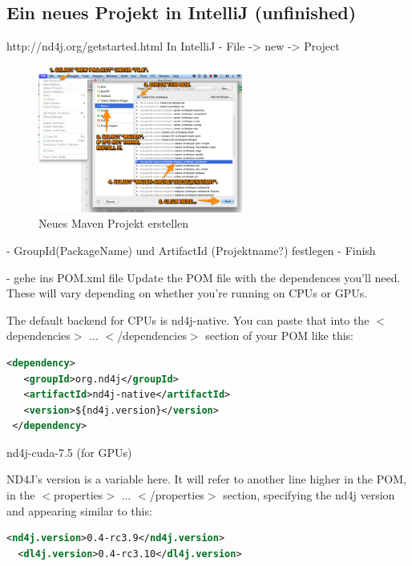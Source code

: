 {\subsection{Ein neues Projekt in IntelliJ (unfinished)}
http://nd4j.org/getstarted.html
In IntelliJ
- File -> new -> Project
\renewcommand{\figurename}{Abb.}
\begin{figure}[htp]
\centering
\includegraphics[width=0.60\textwidth]{pictures/new_maven_project.png}
\caption[Neues Maven Projekt]{Neues Maven Projekt erstellen\protect\footnotemark}
\end{figure}
- GroupId(PackageName) und ArtifactId (Projektname?) festlegen
- Finish

- gehe ins POM.xml file
Update the POM file with the dependences you’ll need. These will vary depending on whether you’re running on CPUs or GPUs.

The default backend for CPUs is nd4j-native. You can paste that into the $<$dependencies$>$ ... $<$/dependencies$>$ section of your POM like this:
\lstset{language=XML}
\begin{lstlisting}[language=XML,caption=applicationContext.xml]
 <dependency>
   <groupId>org.nd4j</groupId>
   <artifactId>nd4j-native</artifactId>
   <version>${nd4j.version}</version>
 </dependency>
\end{lstlisting}
nd4j-cuda-7.5 (for GPUs)

ND4J’s version is a variable here. It will refer to another line higher in the POM, in the $<$properties$>$ ... 
$<$/properties$>$ section, specifying the nd4j version and appearing similar to this:
\begin{lstlisting}[language=XML,caption=applicationContext.xml]
  <nd4j.version>0.4-rc3.9</nd4j.version>
  <dl4j.version>0.4-rc3.10</dl4j.version>
\end{lstlisting}

}
